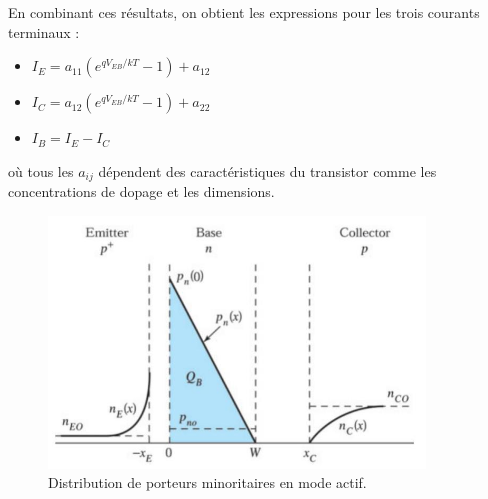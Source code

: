 En combinant ces résultats, on obtient les expressions pour les trois courants terminaux :
\begin{itemize}
	\item $I_E = a_{11} (e^{qV_{EB}/kT} - 1) + a_{12}$
	\item $I_C = a_{12} (e^{qV_{EB}/kT} - 1) + a_{22}$
	\item $I_B = I_E - I_C$
\end{itemize}
où tous les $a_{ij}$ dépendent des caractéristiques du transistor comme les concentrations de dopage et les dimensions. 
\begin{figure}[h!]
\centering
\includegraphics[width=10cm]{figures/ch01/bjt5.jpg}
\caption{Distribution de porteurs minoritaires en mode actif.} 
\label{fig:bjt5}
\end{figure}

